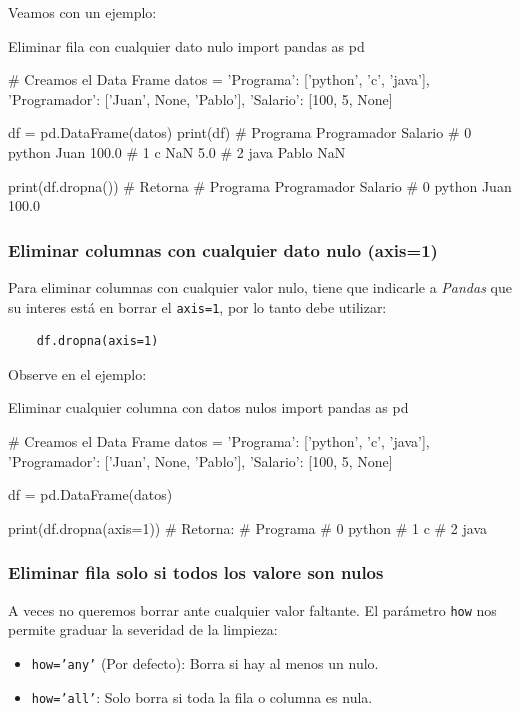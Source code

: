 Veamos con un ejemplo:
\begin{pycode}{Eliminar fila con cualquier dato nulo}
import pandas as pd

# Creamos el Data Frame
datos = {
    'Programa': ['python', 'c', 'java'],
    'Programador': ['Juan', None, 'Pablo'],
    'Salario': [100, 5, None]
}    

df = pd.DataFrame(datos)
print(df)
#   Programa Programador  Salario
# 0   python        Juan    100.0
# 1        c         NaN      5.0
# 2     java       Pablo      NaN

print(df.dropna()) # Retorna
#   Programa Programador  Salario
# 0   python        Juan    100.0

\end{pycode}

\subsubsection{Eliminar columnas con cualquier dato nulo (axis=1)}

Para eliminar columnas con cualquier valor nulo, tiene que indicarle a \textit{Pandas} que su interes está en borrar el \texttt{axis=1}, por lo tanto debe utilizar:
\begin{verbatim}
    df.dropna(axis=1)
\end{verbatim}

Observe en el ejemplo:
\begin{pycode}{Eliminar cualquier columna con datos nulos}
import pandas as pd

# Creamos el Data Frame
datos = {
    'Programa': ['python', 'c', 'java'],
    'Programador': ['Juan', None, 'Pablo'],
    'Salario': [100, 5, None]
}    

df = pd.DataFrame(datos)

print(df.dropna(axis=1)) # Retorna:
#   Programa
# 0   python
# 1        c
# 2     java

\end{pycode}

\subsubsection{Eliminar fila solo si todos los valore son nulos}

A veces no queremos borrar ante cualquier valor faltante. El parámetro \texttt{how} nos permite graduar la severidad de la limpieza:
\begin{itemize}
\item \texttt{how='any'} (Por defecto): Borra si hay al menos un nulo.
\item \texttt{how='all'}: Solo borra si toda la fila o columna es nula.
\end{itemize}

